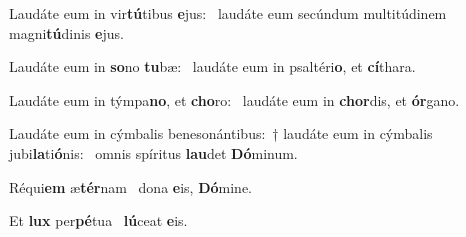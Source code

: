 \item Laudáte eum in vir\textbf{tú}tibus \textbf{e}jus:~\psstar{} laudáte eum secúndum multitúdinem magni\textbf{tú}dinis \textbf{e}jus.

\item Laudáte eum in \textbf{so}no \textbf{tu}bæ:~\psstar{} laudáte eum in psaltéri\textbf{o}, et \textbf{cí}thara.

\item Laudáte eum in týmpa\textbf{no}, et \textbf{cho}ro:~\psstar{} laudáte eum in \textbf{chor}dis, et \textbf{ór}gano.

\item Laudáte eum in cýmbalis benesonántibus:~† laudáte eum in cýmbalis jubi\textbf{la}ti\textbf{ó}nis:~\psstar{} omnis spíritus \textbf{lau}det \textbf{Dó}minum.

\item Réqui\textbf{em} æ\textbf{tér}nam~\psstar{} dona \textbf{e}is, \textbf{Dó}mine.

\item Et \textbf{lux} per\textbf{pé}tua~\psstar{} \textbf{lú}ceat \textbf{e}is.